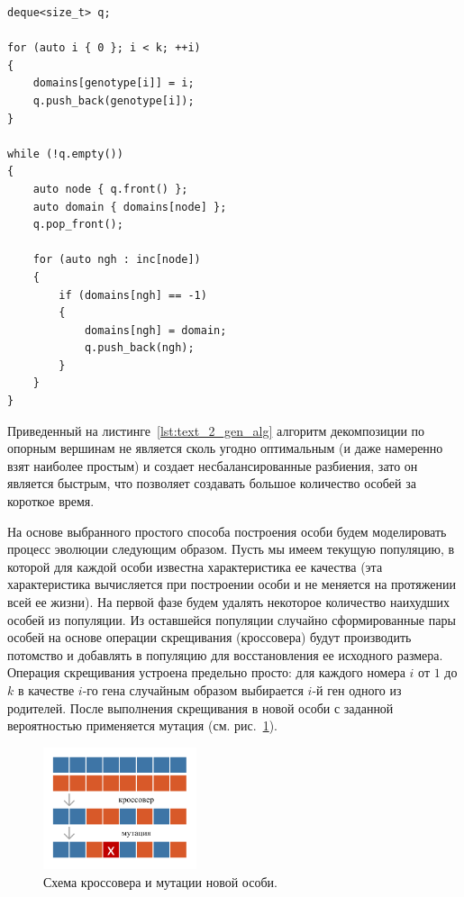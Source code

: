 \begin{lstlisting}[caption={Простая декомпозиция, используемая в генетическом алгоритме.},label={lst:text_2_gen_alg}]
deque<size_t> q;

for (auto i { 0 }; i < k; ++i)
{
    domains[genotype[i]] = i;
    q.push_back(genotype[i]);
}

while (!q.empty())
{
    auto node { q.front() };
    auto domain { domains[node] };
    q.pop_front();

    for (auto ngh : inc[node])
    {
        if (domains[ngh] == -1)
        {
            domains[ngh] = domain;
            q.push_back(ngh);
        }
    }
}
\end{lstlisting}

Приведенный на листинге~\ref{lst:text_2_gen_alg} алгоритм декомпозиции по опорным вершинам не является сколь угодно оптимальным (и даже намеренно взят наиболее простым) и создает несбалансированные разбиения, зато он является быстрым, что позволяет создавать большое количество особей за короткое время.

На основе выбранного простого способа построения особи будем моделировать процесс эволюции следующим образом.
Пусть мы имеем текущую популяцию, в которой для каждой особи известна характеристика ее качества (эта характеристика вычисляется при построении особи и не меняется на протяжении всей ее жизни).
На первой фазе будем удалять некоторое количество наихудших особей из популяции.
Из оставшейся популяции случайно сформированные пары особей на основе операции скрещивания (кроссовера) будут производить потомство и добавлять в популяцию для восстановления ее исходного размера.
Операция скрещивания устроена предельно просто: для каждого номера $i$ от $1$ до $k$ в качестве $i$-го гена случайным образом выбирается $i$-й ген одного из родителей.
После выполнения скрещивания в новой особи с заданной вероятностью применяется мутация (см. рис.~\ref{fig:text_2_genetic_evolution}).

\begin{figure}[ht]
\centering
\includegraphics[width=0.4\textwidth]{./pics/text_2_genetic/evolution.pdf}
\caption{Схема кроссовера и мутации новой особи.}
\label{fig:text_2_genetic_evolution}
\end{figure}

